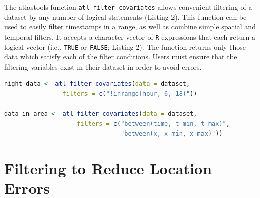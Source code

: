 \documentclass[10pt,paper=a4,headings=standardclasses
]{scrartcl}
\begin{document}
The atlastools function \texttt{atl\_filter\_covariates} allows convenient filtering of a dataset by any number of logical statements (Listing 2).
This function can be used to easily filter timestamps in a range, as well as combine simple spatial and temporal filters.
It accepts a character vector of \texttt{R} expressions that each return a logical vector (i.e., \texttt{TRUE} or \texttt{FALSE}; Listing 2).
The function returns only those data which satisfy each of the filter conditions. 
Users must ensure that the filtering variables exist in their dataset in order to avoid errors.

\begin{lstlisting}[float, language=R, style=customR, caption = {
    The \texttt{atl\_filter\_covariates} function can be used both as a simple temporal filter, and also as a combined spatio-temporal filter. 
    Filter predicates are passed to the \texttt{filters} argument as a character vector, each of which is then evaluated as an \texttt{R} expression in the context of the data supplied. 
    Only rows in the data satisfying all the conditions passed as filters are retained. 
    Users must make sure the filter variables exist in their dataset.
    Here, the first example shows how nighttime data can be retained using a predicate (\texttt{inrange} from \texttt{data.table}) that determine whether the value of `hour' is between 6 and 18. 
    The \texttt{!} sign indicates that the negative of the predicate should be returned, i.e., \texttt{TRUE} when the hour is between 6 PM and 6 AM, but \texttt{FALSE} when the hour is between 6 AM and 6 PM.
    The second example shows the use of multiple filter statements; this data will be filtered to be within the range of times bounded by \texttt{t\_min} and \texttt{t\_max}, and with X coordinates between \texttt{x\_min} and \texttt{x\_max}.
    The \texttt{between} function is from \texttt{data.table}.}]
night_data <- atl_filter_covariates(data = dataset,
                filters = c("!inrange(hour, 6, 18)"))

data_in_area <- atl_filter_covariates(data = dataset,
                    filters = c("between(time, t_min, t_max)",
                                "between(x, x_min, x_max)"))
\end{lstlisting}

\section{Filtering to Reduce Location Errors}
\end{document}
